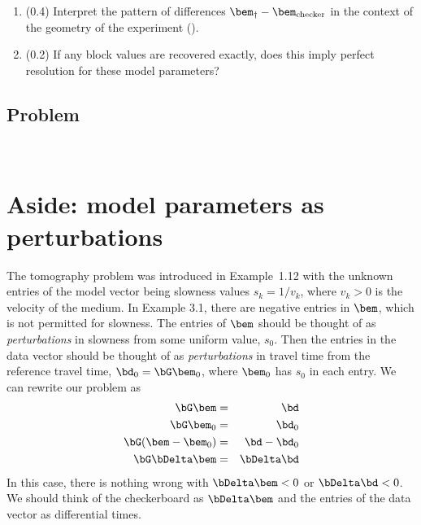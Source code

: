 \documentclass[11pt,titlepage,fleqn]{article}
\begin{document}
\begin{enumerate}
\item (0.4) Interpret the pattern of differences $\bem_{\dagger}-\bem_{\rm checker}$ in the context of the geometry of the experiment ().

\item (0.2) If any block values are recovered exactly, does this imply perfect resolution for these model parameters?
\end{enumerate}


\subsection*{Problem} \howmuchtime\

\pagebreak

\nocite{Aster}


\appendix

\section{Aside: model parameters as perturbations}
\label{sec:pert}

The tomography problem was introduced in Example~1.12 with the unknown entries of the model vector being slowness values $s_k = 1/v_k$, where $v_k > 0$ is the velocity of the medium. In \citet{Aster} Example 3.1, there are negative entries in $\bem$, which is not permitted for slowness. The entries of $\bem$ should be thought of as {\em perturbations} in slowness from some uniform value, $s_0$. Then the entries in the data vector should be thought of as {\em perturbations} in travel time from the reference travel time, $\bd_0 = \bG\bem_0$, where $\bem_0$ has $s_0$ in each entry. We can rewrite our problem as
%
\begin{eqnarray}
\bG\bem &=& \bd
\\
\bG\bem_0 &=& \bd_0
\\
\bG(\bem - \bem_0) &=& \bd - \bd_0
\\
\bG\bDelta\bem &=& \bDelta\bd
\end{eqnarray}
%
In this case, there is nothing wrong with $\bDelta\bem < 0$ or $\bDelta\bd < 0$. We should think of the checkerboard as $\bDelta\bem$ and the entries of the data vector as differential times.
\end{document}

